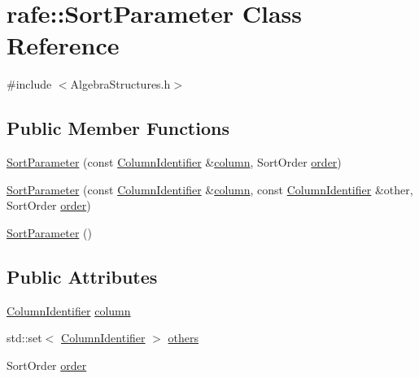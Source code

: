 \hypertarget{classrafe_1_1_sort_parameter}{\section{rafe\+:\+:Sort\+Parameter Class Reference}
\label{classrafe_1_1_sort_parameter}
}


{\ttfamily \#include $<$Algebra\+Structures.\+h$>$}

\subsection*{Public Member Functions}
\begin{DoxyCompactItemize}
\item 
\hyperlink{classrafe_1_1_sort_parameter_a1748ce84437a875ef7d4987f0055bac0}{Sort\+Parameter} (const \hyperlink{classrafe_1_1_column_identifier}{Column\+Identifier} \&\hyperlink{classrafe_1_1_sort_parameter_ab28a61edbd40e46e55fac81024e5cdf8}{column}, Sort\+Order \hyperlink{classrafe_1_1_sort_parameter_ac4bb3225464a463206abfc4ef7a4a875}{order})
\item 
\hyperlink{classrafe_1_1_sort_parameter_a571296618f3221f73816476e9400740e}{Sort\+Parameter} (const \hyperlink{classrafe_1_1_column_identifier}{Column\+Identifier} \&\hyperlink{classrafe_1_1_sort_parameter_ab28a61edbd40e46e55fac81024e5cdf8}{column}, const \hyperlink{classrafe_1_1_column_identifier}{Column\+Identifier} \&other, Sort\+Order \hyperlink{classrafe_1_1_sort_parameter_ac4bb3225464a463206abfc4ef7a4a875}{order})
\item 
\hyperlink{classrafe_1_1_sort_parameter_aecac30fa78de2f0af658d32a1c5ee0fc}{Sort\+Parameter} ()
\end{DoxyCompactItemize}
\subsection*{Public Attributes}
\begin{DoxyCompactItemize}
\item 
\hyperlink{classrafe_1_1_column_identifier}{Column\+Identifier} \hyperlink{classrafe_1_1_sort_parameter_ab28a61edbd40e46e55fac81024e5cdf8}{column}
\item 
std\+::set$<$ \hyperlink{classrafe_1_1_column_identifier}{Column\+Identifier} $>$ \hyperlink{classrafe_1_1_sort_parameter_ae8a1dda682edec1b98e928590763ba85}{others}
\item 
Sort\+Order \hyperlink{classrafe_1_1_sort_parameter_ac4bb3225464a463206abfc4ef7a4a875}{order}
\end{DoxyCompactItemize}


